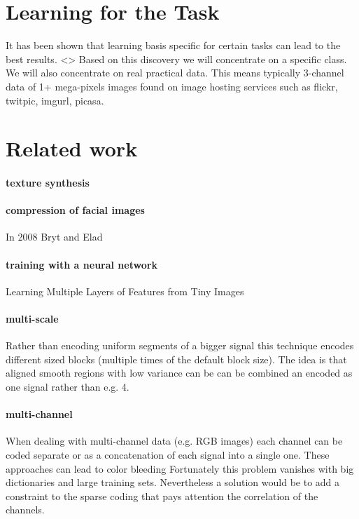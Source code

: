 \section{Learning for the Task}
It has been shown that learning basis specific for certain tasks can lead to the best results\cite{sapiro?}.  <>
Based on this discovery we will concentrate on a specific class. 
We will also concentrate on real practical data. This means typically 3-channel data of 1+ mega-pixels images found on image hosting services such as flickr, twitpic, imgurl, picasa.


\section{Related work}




\paragraph{texture synthesis}

\paragraph{compression of facial images}
In 2008 Bryt and Elad \cite{Bryt2008} 

\paragraph{training with a neural network}
Learning Multiple Layers of Features from Tiny Images \cite{Krizhevsky2009}


\paragraph{multi-scale}
Rather than encoding uniform segments of a bigger signal this technique encodes different sized 
blocks (multiple times of the default block size). The idea is that aligned smooth regions with low variance can be 
can be combined an encoded as one signal rather than e.g. 4. \cite{saprio}
\cite{Mairal2007}


\paragraph{multi-channel}
When dealing with multi-channel data (e.g. RGB images) 
each channel can be coded separate or as a concatenation of each signal into a single one.
These approaches can lead to color bleeding \cite{mairal08sparse} 
Fortunately this problem vanishes with big dictionaries and large training sets. \cite{mairal08sparse}
Nevertheless a solution would be to add a constraint to the sparse coding that pays attention the correlation of the channels.

